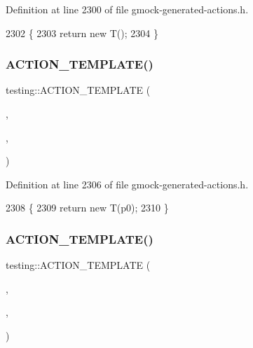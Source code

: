 Definition at line 2300 of file gmock-\/generated-\/actions.\+h.


\begin{DoxyCode}
2302                                       \{
2303   \textcolor{keywordflow}{return} \textcolor{keyword}{new} T();
2304 \}
\end{DoxyCode}
\mbox{\label{namespacetesting_af07e911d69b8efb03bddbd0332f79ba0}} 
\subsubsection{\texorpdfstring{A\+C\+T\+I\+O\+N\+\_\+\+T\+E\+M\+P\+L\+A\+T\+E()}{ACTION\_TEMPLATE()}\hspace{0.1cm}{\footnotesize\ttfamily [19/28]}}
{\footnotesize\ttfamily testing\+::\+A\+C\+T\+I\+O\+N\+\_\+\+T\+E\+M\+P\+L\+A\+TE (\begin{DoxyParamCaption}\item[{Return\+New}]{,  }\item[{H\+A\+S\+\_\+1\+\_\+\+T\+E\+M\+P\+L\+A\+T\+E\+\_\+\+P\+A\+R\+A\+MS(typename, T)}]{,  }\item[{A\+N\+D\+\_\+1\+\_\+\+V\+A\+L\+U\+E\+\_\+\+P\+A\+R\+A\+MS(p0)}]{ }\end{DoxyParamCaption})}



Definition at line 2306 of file gmock-\/generated-\/actions.\+h.


\begin{DoxyCode}
2308                                         \{
2309   \textcolor{keywordflow}{return} \textcolor{keyword}{new} T(p0);
2310 \}
\end{DoxyCode}
\mbox{\label{namespacetesting_ad418620ed637e789f91d029f4fe85b4b}} 
\subsubsection{\texorpdfstring{A\+C\+T\+I\+O\+N\+\_\+\+T\+E\+M\+P\+L\+A\+T\+E()}{ACTION\_TEMPLATE()}\hspace{0.1cm}{\footnotesize\ttfamily [20/28]}}
{\footnotesize\ttfamily testing\+::\+A\+C\+T\+I\+O\+N\+\_\+\+T\+E\+M\+P\+L\+A\+TE (\begin{DoxyParamCaption}\item[{Return\+New}]{,  }\item[{H\+A\+S\+\_\+1\+\_\+\+T\+E\+M\+P\+L\+A\+T\+E\+\_\+\+P\+A\+R\+A\+MS(typename, T)}]{,  }\item[{A\+N\+D\+\_\+2\+\_\+\+V\+A\+L\+U\+E\+\_\+\+P\+A\+R\+A\+MS(p0, p1)}]{ }\end{DoxyParamCaption})}



